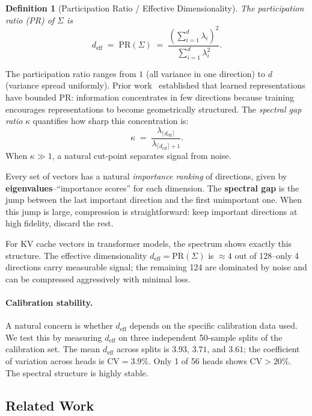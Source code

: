 \documentclass[11pt]{article}
\newtheorem{definition}[theorem]{Definition}
\newcommand{\deff}{d_{\mathrm{eff}}}
\newcommand{\PR}{\mathrm{PR}}
\begin{document}
\begin{definition}[Participation Ratio / Effective Dimensionality]
The \emph{participation ratio} (PR) of $\Sigma$ is
\[
  \deff \;=\; \PR(\Sigma) \;=\; \frac{\left(\sum_{i=1}^d \lambda_i\right)^2}
  {\sum_{i=1}^d \lambda_i^2}.
\]
\end{definition}

The participation ratio ranges from $1$ (all variance in one direction) to $d$
(variance spread uniformly).  Prior work~\citep{barman2026price,
barman2026geometry} established that learned representations have bounded PR:
information concentrates in few directions because training encourages
representations to become geometrically structured.  The \emph{spectral gap
ratio} $\kappa$ quantifies how sharp this concentration is:
\[
  \kappa \;=\; \frac{\lambda_{\lceil \deff \rceil}}
  {\lambda_{\lceil \deff \rceil + 1}}.
\]
When $\kappa \gg 1$, a natural cut-point separates signal from noise.

\begin{conceptbox}
\label{box:spectralgap}
Every set of vectors has a natural \emph{importance ranking} of directions,
given by \textbf{eigenvalues}--``importance scores'' for each dimension.  The
\textbf{spectral gap} is the jump between the last important direction and the
first unimportant one.  When this jump is large, compression is
straightforward: keep important directions at high fidelity, discard the rest.

For KV cache vectors in transformer models, the spectrum shows exactly this
structure.  The effective dimensionality $\deff = \PR(\Sigma)$ is $\approx 4$
out of 128--only 4 directions carry measurable signal; the remaining 124 are
dominated by noise and can be compressed aggressively with minimal loss.
\end{conceptbox}

\paragraph{Calibration stability.}
A natural concern is whether $\deff$ depends on the specific calibration data
used.  We test this by measuring $\deff$ on three independent 50-sample splits
of the calibration set.  The mean $\deff$ across splits is $3.93$, $3.71$, and
$3.61$; the coefficient of variation across heads is $\mathrm{CV} = 3.9\%$.
Only 1 of 56 heads shows $\mathrm{CV} > 20\%$.  The spectral structure is
highly stable.

\subsection{Related Work}
\label{subsec:related}
\end{document}
